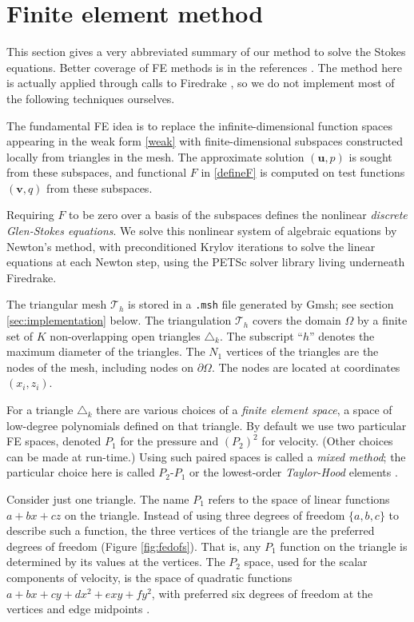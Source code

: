 \documentclass[letterpaper,final,12pt,reqno]{amsart}
\newcommand{\bu}{\mathbf{u}}
\newcommand{\bv}{\mathbf{v}}
\begin{document}
\section{Finite element method} \label{sec:femethod}

This section gives a very abbreviated summary of our method to solve the Stokes equations.  Better coverage of FE methods is in the references \cite{Braess2007,Bueler2021,Elmanetal2014}.  The method here is actually applied through calls to Firedrake \cite{Rathgeberetal2016}, so we do not implement most of the following techniques ourselves.

The fundamental FE idea is to replace the infinite-dimensional function spaces appearing in the weak form \eqref{weak} with finite-dimensional subspaces constructed locally from triangles in the mesh.  The approximate solution $(\bu,p)$ is sought from these subspaces, and functional $F$ in \eqref{defineF} is computed on test functions $(\bv,q)$ from these subspaces.

Requiring $F$ to be zero over a basis of the subspaces defines the nonlinear \emph{discrete Glen-Stokes equations}.  We solve this nonlinear system of algebraic equations by Newton's method, with preconditioned Krylov iterations to solve the linear equations at each Newton step, using the PETSc solver library \cite{Balayetal2018,Bueler2021} living underneath Firedrake.

The triangular mesh $\mathcal{T}_h$ is stored in a \texttt{.msh} file generated by Gmsh; see section \ref{sec:implementation} below.  The triangulation $\mathcal{T}_h$ covers the domain $\Omega$ by a finite set of $K$ non-overlapping open triangles $\triangle_k$.  The subscript ``$h$'' denotes the maximum diameter of the triangles.  The $N_1$ vertices of the triangles are the nodes of the mesh, including nodes on $\partial\Omega$.  The nodes are located at coordinates $(x_i,z_i)$.

For a triangle $\triangle_k$ there are various choices of a \emph{finite element space}, a space of low-degree polynomials defined on that triangle.  By default we use two particular FE spaces, denoted $P_1$ for the pressure and $(P_2)^2$ for velocity.  (Other choices can be made at run-time.)  Using such paired spaces is called a \emph{mixed method}; the particular choice here is called $P_2$-$P_1$ or the lowest-order \emph{Taylor-Hood} elements \cite{Elmanetal2014}.

Consider just one triangle.  The name $P_1$ refers to the space of linear functions $a + b x + c z$ on the triangle.  Instead of using three degrees of freedom $\{a,b,c\}$ to describe such a function, the three vertices of the triangle are the preferred degrees of freedom (Figure \ref{fig:fedofs}).  That is, any $P_1$ function on the triangle is determined by its values at the vertices.  The $P_2$ space, used for the scalar components of velocity, is the space of quadratic functions $a + bx + cy + dx^2 + exy + fy^2$, with preferred six degrees of freedom at the vertices and edge midpoints \cite{Elmanetal2014}.
\end{document}
